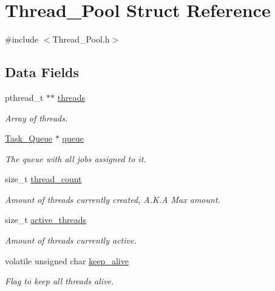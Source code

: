 \hypertarget{struct_thread___pool}{}\section{Thread\+\_\+\+Pool Struct Reference}
\label{struct_thread___pool}


{\ttfamily \#include $<$Thread\+\_\+\+Pool.\+h$>$}

\subsection*{Data Fields}
\begin{DoxyCompactItemize}
\item 
pthread\+\_\+t $\ast$$\ast$ \hyperlink{struct_thread___pool_ad525884783bf7870b455a6d9f48b30bb}{threads}
\begin{DoxyCompactList}\small\item\em Array of threads. \end{DoxyCompactList}\item 
\hyperlink{struct_task___queue}{Task\+\_\+\+Queue} $\ast$ \hyperlink{struct_thread___pool_ae83721ed927ae7124473880b3b14e3a7}{queue}
\begin{DoxyCompactList}\small\item\em The queue with all jobs assigned to it. \end{DoxyCompactList}\item 
size\+\_\+t \hyperlink{struct_thread___pool_a5c106e0816fd7534cf350f800fdb52e0}{thread\+\_\+count}
\begin{DoxyCompactList}\small\item\em Amount of threads currently created, A.\+K.\+A Max amount. \end{DoxyCompactList}\item 
size\+\_\+t \hyperlink{struct_thread___pool_a5cb991a29ec47a426811c8e09f979a2e}{active\+\_\+threads}
\begin{DoxyCompactList}\small\item\em Amount of threads currently active. \end{DoxyCompactList}\item 
volatile unsigned char \hyperlink{struct_thread___pool_ac24a1c7364475077551efc2e48bda9d0}{keep\+\_\+alive}
\begin{DoxyCompactList}\small\item\em Flag to keep all threads alive. \end{DoxyCompactList}\item 
$$
\end{DoxyCompactItemize}
